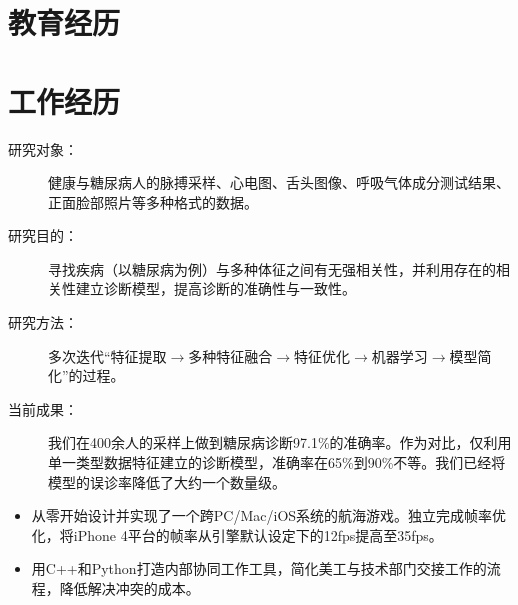 \documentclass[11pt,a4paper]{moderncv/moderncv}
\begin{document}
\maketitle

\section{教育经历}


\section{工作经历}
{
\begin{description}
	\item[研究对象：] 健康与糖尿病人的脉搏采样、心电图、舌头图像、呼吸气体成分测试结果、正面脸部照片等多种格式的数据。
	\item[研究目的：] 寻找疾病（以糖尿病为例）与多种体征之间有无强相关性，并利用存在的相关性建立诊断模型，提高诊断的准确性与一致性。
	\item[研究方法：] 多次迭代``特征提取$\rightarrow$多种特征融合$\rightarrow$特征优化$\rightarrow$机器学习$\rightarrow$模型简化''的过程。
	\item[当前成果：] 我们在400余人的采样上做到糖尿病诊断97.1\%的准确率。作为对比，仅利用单一类型数据特征建立的诊断模型，准确率在65\%到90\%不等。我们已经将模型的误诊率降低了大约一个数量级。
\end{description}
}

{
\begin{itemize}
	\item 从零开始设计并实现了一个跨PC/Mac/iOS系统的航海游戏。独立完成帧率优化，将iPhone 4平台的帧率从引擎默认设定下的12fps提高至35fps。
	\item 用C++和Python打造内部协同工作工具，简化美工与技术部门交接工作的流程，降低解决冲突的成本。
\end{itemize}
}
\end{document}

